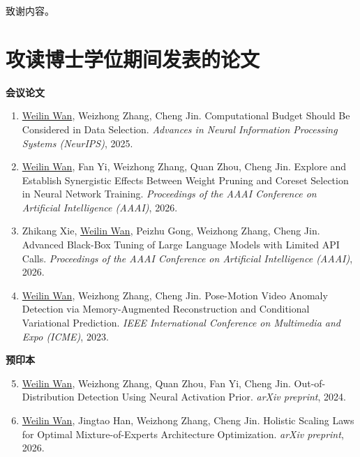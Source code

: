 \documentclass[type=doctor]{fduthesis}
\begin{document}
\mainmatter








\backmatter

\printbibliography

\begin{acknowledgements}
  致谢内容。
\end{acknowledgements}

{
\chapter*{攻读博士学位期间发表的论文}

\noindent\textbf{会议论文}

\begin{enumerate}
  \item \underline{Weilin Wan}, Weizhong Zhang, Cheng Jin. Computational Budget Should Be Considered in Data Selection. \textit{Advances in Neural Information Processing Systems (NeurIPS)}, 2025.

  \item \underline{Weilin Wan}, Fan Yi, Weizhong Zhang, Quan Zhou, Cheng Jin. Explore and Establish Synergistic Effects Between Weight Pruning and Coreset Selection in Neural Network Training. \textit{Proceedings of the AAAI Conference on Artificial Intelligence (AAAI)}, 2026.

  \item Zhikang Xie, \underline{Weilin Wan}, Peizhu Gong, Weizhong Zhang, Cheng Jin. Advanced Black-Box Tuning of Large Language Models with Limited API Calls. \textit{Proceedings of the AAAI Conference on Artificial Intelligence (AAAI)}, 2026.

  \item \underline{Weilin Wan}, Weizhong Zhang, Cheng Jin. Pose-Motion Video Anomaly Detection via Memory-Augmented Reconstruction and Conditional Variational Prediction. \textit{IEEE International Conference on Multimedia and Expo (ICME)}, 2023.
\end{enumerate}

\noindent\textbf{预印本}

\begin{enumerate}
  \setcounter{enumi}{4}
  \item \underline{Weilin Wan}, Weizhong Zhang, Quan Zhou, Fan Yi, Cheng Jin. Out-of-Distribution Detection Using Neural Activation Prior. \textit{arXiv preprint}, 2024.

  \item \underline{Weilin Wan}, Jingtao Han, Weizhong Zhang, Cheng Jin. Holistic Scaling Laws for Optimal Mixture-of-Experts Architecture Optimization. \textit{arXiv preprint}, 2026.
\end{enumerate}
}
\end{document}
